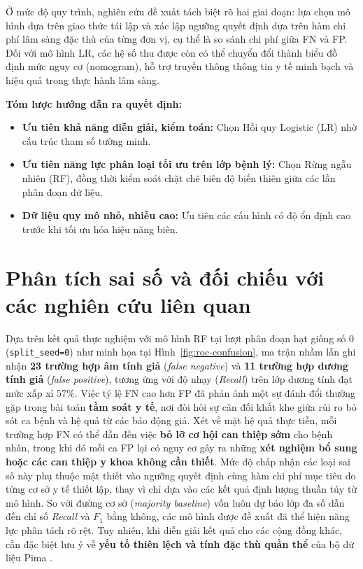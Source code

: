 \documentclass[14pt,a4paper]{extreport}
\begin{document}
Ở mức độ quy trình, nghiên cứu đề xuất tách biệt rõ hai giai đoạn: lựa chọn mô hình dựa trên giao thức tái lập và xác lập ngưỡng quyết định dựa trên hàm chi phí lâm sàng đặc thù của từng đơn vị, cụ thể là so sánh chi phí giữa FN và FP. Đối với mô hình LR, các hệ số thu được còn có thể chuyển đổi thành biểu đồ định mức nguy cơ (nomogram), hỗ trợ truyền thông thông tin y tế minh bạch và hiệu quả trong thực hành lâm sàng.

\textbf{Tóm lược hướng dẫn ra quyết định:}
\begin{itemize}
  \item \textbf{Ưu tiên khả năng diễn giải, kiểm toán:} Chọn Hồi quy Logistic (LR) nhờ cấu trúc tham số tường minh.
  \item \textbf{Ưu tiên năng lực phân loại tối ưu trên lớp bệnh lý:} Chọn Rừng ngẫu nhiên (RF), đồng thời kiểm soát chặt chẽ biên độ biến thiên giữa các lần phân đoạn dữ liệu.
  \item \textbf{Dữ liệu quy mô nhỏ, nhiễu cao:} Ưu tiên các cấu hình có độ ổn định cao trước khi tối ưu hóa hiệu năng biên.
\end{itemize}

\section{Phân tích sai số và đối chiếu với các nghiên cứu liên quan}
\label{subsec:disc-error-related}

Dựa trên kết quả thực nghiệm với mô hình RF tại lượt phân đoạn hạt giống số 0 (\texttt{split\_seed=0}) như minh họa tại Hình~\ref{fig:roc-confusion}, ma trận nhầm lẫn ghi nhận \textbf{23 trường hợp âm tính giả} (\textit{false negative}) và \textbf{11 trường hợp dương tính giả} (\textit{false positive}), tương ứng với độ nhạy (\textit{Recall}) trên lớp dương tính đạt mức xấp xỉ $57\%$. Việc tỷ lệ FN cao hơn FP đã phản ánh một sự đánh đổi thường gặp trong bài toán \textbf{tầm soát y tế}, nơi đòi hỏi sự cân đối khắt khe giữa rủi ro bỏ sót ca bệnh và hệ quả từ các báo động giả. Xét về mặt hệ quả thực tiễn, mỗi trường hợp FN có thể dẫn đến việc \textbf{bỏ lỡ cơ hội can thiệp sớm} cho bệnh nhân, trong khi đó mỗi ca FP lại có nguy cơ gây ra những \textbf{xét nghiệm bổ sung hoặc các can thiệp y khoa không cần thiết}. Mức độ chấp nhận các loại sai số này phụ thuộc mật thiết vào ngưỡng quyết định cùng hàm chi phí mục tiêu do từng cơ sở y tế thiết lập, thay vì chỉ dựa vào các kết quả định lượng thuần túy từ mô hình. So với đường cơ sở (\textit{majority baseline}) vốn luôn dự báo lớp đa số dẫn đến chỉ số \textit{Recall} và $F_1$ bằng không, các mô hình được đề xuất đã thể hiện năng lực phân tách rõ rệt. Tuy nhiên, khi diễn giải kết quả cho các cộng đồng khác, cần đặc biệt lưu ý về \textbf{yếu tố thiên lệch và tính đặc thù quần thể} của bộ dữ liệu Pima \cite{uci-pima}.
\end{document}
